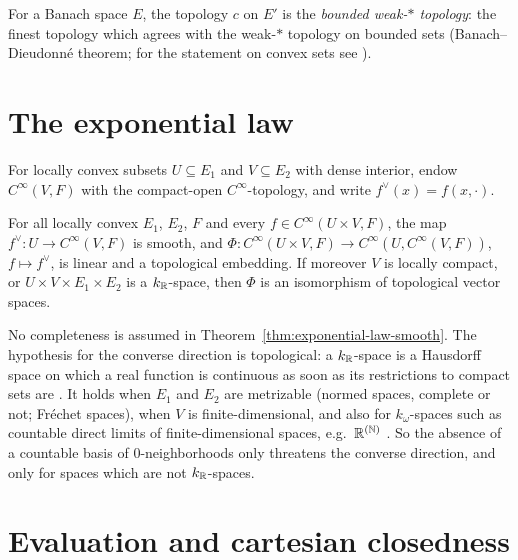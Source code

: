 For a Banach space $E$, the topology $c$ on $E'$ is the \emph{bounded weak-$*$ topology}: the
finest topology which agrees with the weak-$*$ topology on bounded sets (Banach--Dieudonné
theorem; for the statement on convex sets see \cite[Thm.~4.44]{FHHMPZ01}).

\section{The exponential law}

For locally convex subsets $U \subseteq E_1$ and $V \subseteq E_2$ with dense interior, endow
$C^\infty(V, F)$ with the compact-open $C^\infty$-topology, and write
$f^\vee(x) = f(x, \cdot)$.

\begin{theorem}
  \label{thm:exponential-law-smooth}
  For all locally convex $E_1$, $E_2$, $F$ and every $f \in C^\infty(U \times V, F)$, the map
  $f^\vee \colon U \to C^\infty(V, F)$ is smooth, and
  $\Phi \colon C^\infty(U \times V, F) \to C^\infty(U, C^\infty(V, F))$, $f \mapsto f^\vee$, is
  linear and a topological embedding. If moreover $V$ is locally compact, or
  $U \times V \times E_1 \times E_2$ is a $k_{\mathbb{R}}$-space, then $\Phi$ is an isomorphism of
  topological vector spaces.
\end{theorem}

\begin{remark}
  \label{rem:exponential-law-completeness}
  No completeness is assumed in Theorem~\ref{thm:exponential-law-smooth}. The hypothesis for the
  converse direction is topological: a $k_{\mathbb{R}}$-space is a Hausdorff space on which a real
  function is continuous as soon as its restrictions to compact sets are
  \cite[Rem.~A.6.15]{GN26}. It holds when $E_1$ and $E_2$ are metrizable (normed spaces,
  complete or not; Fréchet spaces), when $V$ is finite-dimensional, and also for
  $k_\omega$-spaces such as countable direct limits of finite-dimensional spaces, e.g.\
  $\mathbb{R}^{(\mathbb{N})}$ \cite[Rem.~4.1.22, Prop.~A.7.20]{GN26}. So the absence of a countable basis of
  $0$-neighborhoods only threatens the converse direction, and only for spaces which are not
  $k_{\mathbb{R}}$-spaces.
\end{remark}

\section{Evaluation and cartesian closedness}

